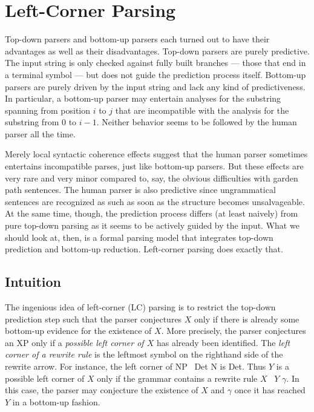\chapter{Left-Corner Parsing}
\label{cha:LeftCorner}

Top-down parsers and bottom-up parsers each turned out to have their advantages as well as their disadvantages.
Top-down parsers are purely predictive.
The input string is only checked against fully built branches --- those that end in a terminal symbol --- but does not guide the prediction process itself.
Bottom-up parsers are purely driven by the input string and lack any kind of predictiveness.
In particular, a bottom-up parser may entertain analyses for the substring spanning from position $i$ to $j$ that are incompatible with the analysis for the substring from $0$ to $i-1$.
Neither behavior seems to be followed by the human parser all the time.

Merely local syntactic coherence effects suggest that the human parser sometimes entertains incompatible parses, just like bottom-up parsers.
But these effects are very rare and very minor compared to, say, the obvious difficulties with garden path sentences.
The human parser is also predictive since ungrammatical sentences are recognized as such as soon as the structure becomes unsalvageable.
At the same time, though, the prediction process differs (at least naively) from pure top-down parsing as it seems to be actively guided by the input.
What we should look at, then, is a formal parsing model that integrates top-down prediction and bottom-up reduction.
Left-corner parsing does exactly that.

\section{Intuition}
\label{sec:LeftCorner_Intuition}

The ingenious idea of left-corner (LC) parsing is to restrict the top-down prediction step such that the parser conjectures $X$ only if there is already some bottom-up evidence for the existence of $X$.
More precisely, the parser conjectures an XP only if a \emph{possible left corner of $X$} has already been identified.
The \emph{left corner of a rewrite rule} is the leftmost symbol on the righthand side of the rewrite arrow. 
For instance, the left corner of NP \rewrite\ Det N is Det.
Thus $Y$ is a possible left corner of $X$ only if the grammar contains a rewrite rule $X$ \rewrite\ $Y$ $\gamma$.
In this case, the parser may conjecture the existence of $X$ and $\gamma$ once it has reached $Y$ in a bottom-up fashion.

